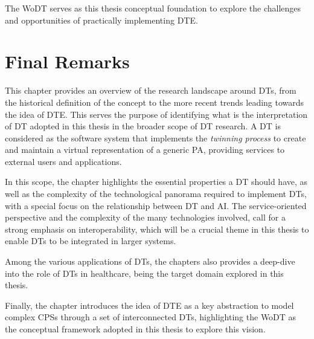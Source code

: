 The \ac{WoDT} serves as this thesis conceptual foundation to explore the challenges and opportunities of practically implementing \ac{DTE}. 


\section{Final Remarks}

This chapter provides an overview of the research landscape around \acp{DT}, from the historical definition of the concept to the more recent trends leading towards the idea of \ac{DTE}. 
%
This serves the purpose of identifying what is the interpretation of \ac{DT} adopted in this thesis in the broader scope of \ac{DT} research.
%
A \ac{DT} is considered as the software system that implements the \emph{twinning process} to create and maintain a virtual representation of a generic \ac{PA}, providing services to external users and applications.

In this scope, the chapter highlights the essential properties a \ac{DT} should have, as well as the complexity of the technological panorama required to implement \acp{DT}, with a special focus on the relationship between \ac{DT} and \ac{AI}.
%
The service-oriented perspective and the complexity of the many technologies involved, call for a strong emphasis on interoperability, which will be a crucial theme in this thesis to enable \acp{DT} to be integrated in larger systems.

Among the various applications of \acp{DT}, the chapters also provides a deep-dive into the role of \acp{DT} in healthcare, being the target domain explored in this thesis.

Finally, the chapter introduces the idea of \ac{DTE} as a key abstraction to model complex \acp{CPS} through a set of interconnected \acp{DT}, highlighting the \ac{WoDT} as the conceptual framework adopted in this thesis to explore this vision.